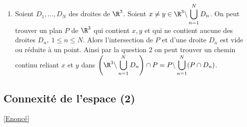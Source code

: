 \documentclass{book}
\begin{document}
\begin{enumerate}[leftmargin=*]
		On relie $z$ à $z'$ par $\gamma$ le chemin composé de :
		\begin{itemize}
			\item $\tau_i(t)=(1-t)y_i+tx_{i+1}$ (translation de $y_i$ à $x_{i+1}$);
			\item $r_i(t)=z_i-\delta e^{i\pi t}u$ (rotation de centre $z_i$ et de rayon $\delta$ de $x_i$ à $y_i$);
		\end{itemize}
		Soit $i\in \crblanc{1}{n}$. Par définition $\tau_{i-1}([0,1])=[z_{i-1}+\delta u,z_i-\delta u]\subset ]z_{i-1},z_i[\subset \tilde\C$. $\delta$ est aussi choisi pour que $x_i-y_{i-1}=\lambda u$ avec $\lambda>0$.\\
		Et $\forall t\in [0,1],\ \forall j\in \crblanc{1}{N},\ |r_i(t)-z_j|\geq \left||z_i-z_j|-\delta|u|\right|\geq |z_i-z_j|-\delta|u|\geq 3|u|\delta-\delta|u|=2\delta|u|>0$. Donc $r([0,1])\subset\tilde\C$.\\
		Ainsi on a construit des chemins continus à valeurs dans $\tilde\C$ reliant $y_i$ à $x_{i+1}$ puis $x_{i+1}$ à $y_{i+1}$. Finalement $z=y_0$ est relié à $z'=x_n$ par un chemin continu à valeurs dans $\tilde\C$.
		\item Soient $D_1,\dots,D_N$ des droites de $\R^3$. Soient $x\ne y\in \R^3\backslash\displaystyle\bigcup_{n=1}^ND_n$. On peut trouver un plan $P$ de $\R^3$ qui contient $x,y$ et qui ne contient aucune des droites $D_n,\ 1\leq n\leq N$. Alors l'intersection de $P$ et d'une droite $D_n$ est vide ou réduite à un point. Ainsi par la question 2 on peut trouver un chemin continu reliant $x$ et $y$ dans $\left(\R^3\backslash\displaystyle\bigcup_{n=1}^ND_n\right)\cap P=P\backslash\displaystyle\bigcup_{n=1}^N(P\cap D_n)$.
	\end{enumerate}
	
	\subsection{Connexité de l'espace (2)}
	\label{sec:connexité-de-l'espace-(2)}
	\textcolor{blue}{\hyperref[Connexité de l'espace (2)]{[Enoncé]}}\\
	
\end{document}
